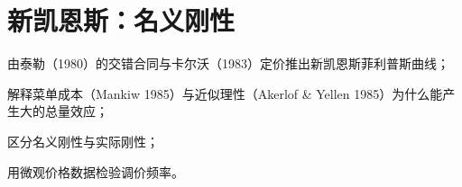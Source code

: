 \chapter{新凯恩斯：名义刚性}\label{ch:newkeynesian}

\begin{chapterguide}
\begin{guidegoals}
\item 由泰勒（1980）的交错合同与卡尔沃（1983）定价推出新凯恩斯菲利普斯曲线；
\item 解释菜单成本（Mankiw 1985）与近似理性（Akerlof \& Yellen 1985）为什么能产生大的总量效应；
\item 区分名义刚性与实际刚性；
\item 用微观价格数据检验调价频率。
\end{guidegoals}
\end{chapterguide}

\chapterstub
